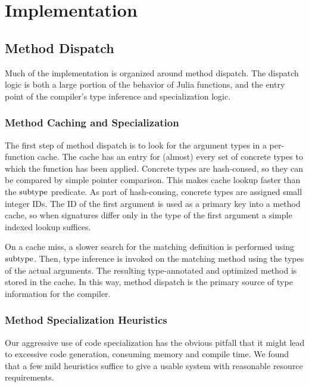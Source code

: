 \chapter{Implementation}

\section{Method Dispatch}

Much of the implementation is organized around method dispatch. The dispatch
logic is both a large portion of the behavior of Julia functions, and the
entry point of the compiler's type inference and specialization logic.

\subsection{Method Caching and Specialization}

The first step of method dispatch is to look for the argument types in a
per-function cache. The cache has an entry for (almost) every set of concrete
types to which the function has been applied. Concrete types are hash-consed,
so they can be compared by simple pointer comparison. This makes cache lookup
faster than the $\operatorname{subtype}$ predicate. As part of hash-consing, concrete types
are assigned small integer IDs. The ID of the first argument is used as a
primary key into a method cache, so when signatures differ only in the
type of the first argument a simple indexed lookup suffices.

On a cache miss, a slower search for the matching definition is performed using
$\operatorname{subtype}$.
Then, type inference is invoked on the matching method using the types
of the actual arguments. The resulting type-annotated and optimized method is
stored in the cache. In this way, method dispatch is the primary source of type
information for the compiler.

\subsection{Method Specialization Heuristics}

Our aggressive use of code specialization has the obvious pitfall that it might
lead to excessive code generation, consuming memory and compile time. We found
that a few mild heuristics suffice to give a usable system with reasonable
resource requirements.

